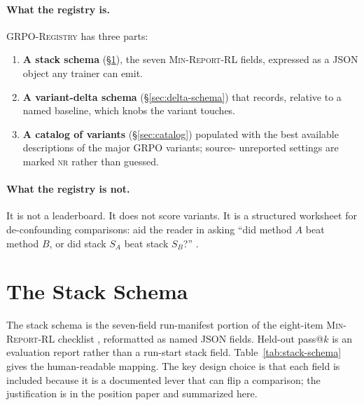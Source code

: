 \documentclass[11pt]{article}
\newcommand{\nr}{\textsc{nr}}
\newcommand{\minreport}{\textsc{Min-Report-RL}}
\newcommand{\grpo}{\textsc{GRPO}}
\newcommand{\grpoReg}{\textsc{GRPO-Registry}}
\begin{document}
\paragraph{What the registry is.} \grpoReg{} has three parts:
\begin{enumerate}[leftmargin=1.6em, itemsep=2pt]
  \item \textbf{A stack schema} (\S\ref{sec:stack-schema}), the seven
    \minreport{} fields, expressed as a JSON object any trainer can emit.
  \item \textbf{A variant-delta schema} (\S\ref{sec:delta-schema}) that
    records, relative to a named baseline, which knobs the variant touches.
  \item \textbf{A catalog of variants} (\S\ref{sec:catalog}) populated with
    the best available descriptions of the major \grpo{} variants; source-
    unreported settings are marked \nr{} rather than guessed.
\end{enumerate}

\paragraph{What the registry is not.} It is not a leaderboard. It does not
score variants. It is a structured worksheet for de-confounding comparisons:
aid the reader in asking ``did method $A$ beat method $B$, or did stack $S_A$
beat stack $S_B$?'' \cite{zvfaudit2026}.

\section{The Stack Schema}
\label{sec:stack-schema}


The stack schema is the seven-field run-manifest portion of the eight-item
\minreport{} checklist \cite{minreportrl2026}, reformatted as named JSON fields.
Held-out pass@$k$ is an evaluation report rather than a run-start stack field.
Table~\ref{tab:stack-schema} gives the
human-readable mapping. The key design choice is that each field is included
because it is a documented lever that can flip a comparison; the justification
is in the position paper and summarized here.
\end{document}
